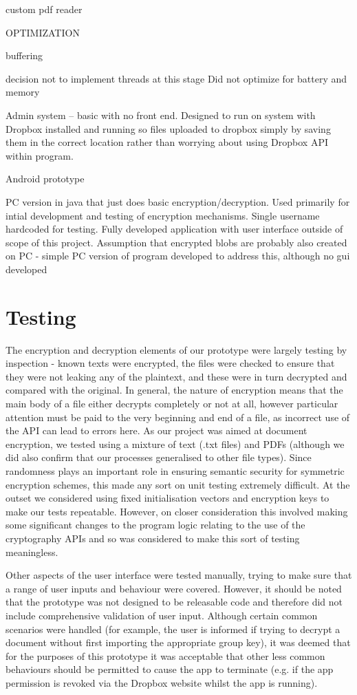 custom pdf reader

OPTIMIZATION

buffering

decision not to implement threads at this stage
Did not optimize for battery and memory



Admin system – basic with no front end.  Designed to run on system with Dropbox installed and running so files uploaded to dropbox simply by saving them in the correct location rather than worrying about using Dropbox API within program.

Android prototype

PC version in java that just does basic encryption/decryption.  Used primarily for intial development and testing of encryption mechanisms. Single username hardcoded for testing. Fully developed application with user interface outside of scope of this project. Assumption that encrypted blobs are probably also created on PC - simple PC version of program developed to address this, although no gui developed
\section{Testing}

The encryption and decryption elements of our prototype were largely testing by inspection - known texts were encrypted, the files were checked to ensure that they were not leaking any of the plaintext, and these were in turn decrypted and compared with the original.   In general, the nature of encryption means that the main body of a file either decrypts completely or not at all, however particular attention must be paid to the very beginning and end of a file, as incorrect use of the API can lead to errors here.  As our project was aimed at document encryption, we tested using a mixture of text (.txt files) and PDFs (although we did also confirm that our processes generalised to other file types).  Since randomness plays an important role in ensuring  semantic security  for symmetric encryption schemes, this made any sort on unit testing extremely difficult.  At the outset we considered using fixed initialisation vectors and encryption keys to make our tests repeatable.  However, on closer consideration this involved making some significant changes to the program logic relating to the use of the cryptography APIs and so was considered to make this sort of testing meaningless.  

Other aspects of the user interface were tested manually, trying to make sure that a range of user inputs and behaviour were covered.  However, it should be noted that the prototype was not designed to be releasable code and therefore did not include comprehensive validation of user input. Although certain common scenarios were handled (for example, the user is informed if trying to decrypt a document without first importing the appropriate group key), it was deemed that for the purposes of this prototype it was acceptable that other less common behaviours should be permitted to cause the app to terminate (e.g. if the app permission is revoked via the Dropbox website whilst the app is running).  

